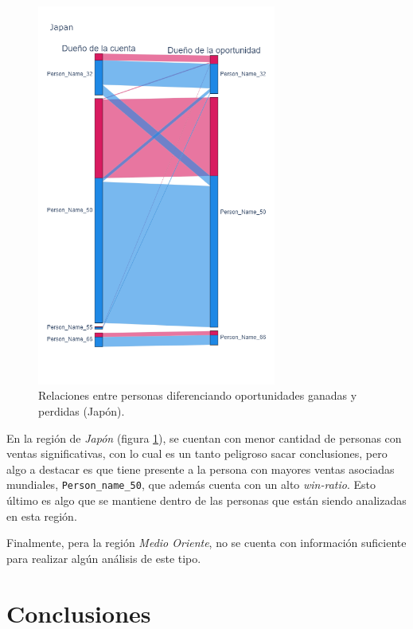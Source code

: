 \documentclass[titlepage,a4paper]{article}
\begin{document}
\begin{figure}[H]
\centering
\includegraphics[width=0.7\textwidth]{images/ps_personas_japan.png}
\cprotect\caption{\label{fig:ps_personas_japan} Relaciones entre personas diferenciando oportunidades ganadas y perdidas (Japón).}
\end{figure}

En la región de \textit{Japón} (figura \ref{fig:ps_personas_japan}), se cuentan con menor cantidad de personas con ventas significativas, con lo cual es un tanto peligroso sacar conclusiones, pero algo a destacar es que tiene presente a la persona con mayores ventas asociadas mundiales, \verb|Person_name_50|, que además cuenta con un alto \textit{win-ratio}. Esto último es algo que se mantiene dentro de las personas que están siendo analizadas en esta región.

Finalmente, pera la región \textit{Medio Oriente}, no se cuenta con información suficiente para realizar algún análisis de este tipo.


\section{Conclusiones}
\end{document}
